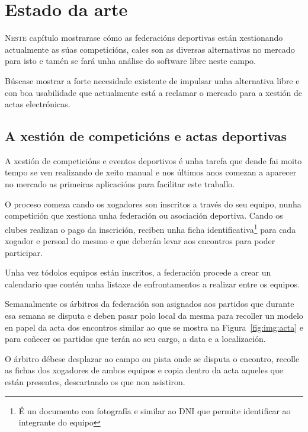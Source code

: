 \chapter{Estado da arte}
\minitoc


  \lettrine{N}{este} capítulo mostrarase cómo as federacións deportivas están 
xestionando actualmente as súas competicións, cales son as diversas 
alternativas no mercado para isto e tamén se fará unha análise do software 
libre neste campo.

  Búscase mostrar a forte necesidade existente de impulsar unha alternativa 
libre e con boa usabilidade que actualmente está a reclamar o mercado para a 
xestión de actas electrónicas.

  \section{A xestión de competicións e actas deportivas}
  A xestión de competicións e eventos deportivos é unha tarefa que dende fai 
moito tempo se ven realizando de xeito manual e nos últimos anos comezan a 
aparecer no mercado as primeiras aplicacións para facilitar este traballo.

  O proceso comeza cando os xogadores son inscritos a través do seu 
equipo, nunha competición que xestiona unha federación ou asociación 
deportiva. Cando os clubes realizan o pago da inscrición, reciben unha ficha 
identificativa\footnote{É un documento con fotografía e similar ao DNI que 
permite identificar ao integrante do equipo} para cada xogador e persoal do 
mesmo e que deberán levar aos encontros para poder participar.

  Unha vez tódolos equipos están inscritos, a federación procede a crear un 
calendario que contén unha listaxe de enfrontamentos a realizar entre os 
equipos.

  Semanalmente os árbitros da federación son asignados aos partidos que durante 
esa semana se disputa e deben pasar polo local da mesma para recoller un 
modelo en papel da acta dos encontros similar ao que se mostra 
na Figura~\ref{fig:img:acta} e para coñecer os partidos que terán ao 
seu cargo, a data e a localización.

  O árbitro débese desplazar ao campo ou pista onde se disputa o encontro, 
recolle as fichas dos xogadores de ambos equipos e copia dentro da acta aqueles 
que están presentes, descartando os que non asistiron.

